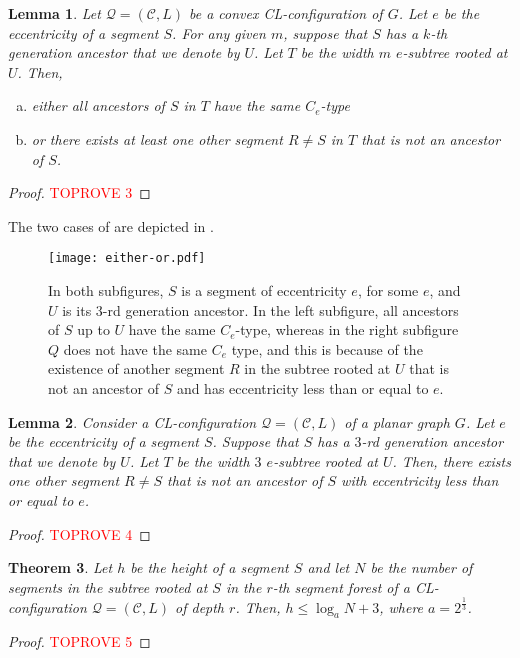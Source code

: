 \documentclass{article}
\newcommand{\hconstant}{3}
\newtheorem{theorem}{Theorem}
\newtheorem{lemma}[theorem]{Lemma}
\numberwithin{claimcounter}{lemma}
\begin{document}
\begin{lemma} \label{lem:eitheror}
Let $\mathcal{Q}=(\mathcal{C},L)$ be a  convex CL-configuration of $G$.
    Let $e$ be the eccentricity of a segment $S$. For any given $m$, suppose that $S$ has a $k$-th generation ancestor that we denote by $U$. Let $T$ be the width $m$ $e$-subtree rooted at $U$. Then, 
    \begin{enumerate}[a.]
        \item  either all ancestors of $S$ in $T$ have the same $C_e$-type
        \item or there exists at least one other segment $R \neq S$ in $T$ that is not an ancestor of $S$.
    \end{enumerate}
\end{lemma}
\begin{proof}\textcolor{red}{TOPROVE 3}\end{proof}

The two cases of  are depicted in .

\begin{figure}[!htb]
    \centering
    \texttt{[image: either-or.pdf]}
    \caption{In both subfigures, $S$ is a segment of eccentricity $e$, for some $e$, and $U$ is its $3$-rd generation ancestor. In the left subfigure, all ancestors of $S$ up to $U$ have the same $C_e$-type, whereas in the right subfigure $Q$ does not have the same $C_e$ type, and this is because of the existence of another segment $R$ in the subtree rooted at $U$ that is not an ancestor of $S$ and has eccentricity less than or equal to $e$.}
    \label{fig:either-or}
\end{figure}

\begin{lemma} \label{lem:atleasttwo}
    Consider a CL-configuration $\mathcal{Q}=(\mathcal{C},L)$ of a planar graph $G$. Let $e$ be the eccentricity of a segment $S$. Suppose that $S$ has a $3$-rd  generation ancestor that we denote by $U$. Let $T$ be the width $3$ $e$-subtree rooted at $U$. Then, there exists one other segment  $R \neq S$ that is not an ancestor of $S$ with eccentricity less than or equal to $e$.
\end{lemma}
\begin{proof}\textcolor{red}{TOPROVE 4}\end{proof}
    
\begin{theorem} \label{thm:logarithmic}
    Let $h$ be the height of a segment $S$ and let $N$ be the number of segments in the subtree rooted at $S$  in the $r$-th segment forest of a  CL-configuration $\mathcal{Q}=(\mathcal{C},L)$ of depth $r$. Then, $h \leq \log_a N + \hconstant$, where $a = 2^{\frac{1}{\hconstant}}$. 
\end{theorem}
\begin{proof}\textcolor{red}{TOPROVE 5}\end{proof}
\end{document}
